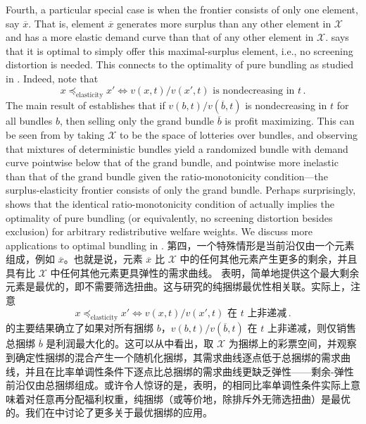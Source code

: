 \documentclass[12pt,letterpaper]{article}
\newenvironment{original}{\color{black}\noindent}{}
\newenvironment{translation}{\color{blue}\noindent}{}
\theoremstyle{plain}
\theoremstyle{definition}
\theoremstyle{remark}
\renewcommand{\1}{\mathds{1}}
\theoremstyle{definition}
\begin{document}
\begin{original}
Fourth, a particular special case is when the frontier consists of only one element, say $\overline{x}$. That is, element $\overline{x}$ generates more surplus than any other element in $\mathcal{X}$ and has a more elastic demand curve than that of any other element in $\mathcal{X}$.  says that it is optimal to simply offer this maximal-surplus element, i.e., no screening distortion is needed. This connects to the optimality of pure bundling as studied in \citet{haghpanah2021pure}. Indeed, note that
\[x \preceq_{\text{elasticity}} x'  \iff v(x, t)/v(x', t) \text{ is nondecreasing in $t$}\,.\]
The main result of \citet{haghpanah2021pure} establishes that if $v(b, t) / v(\overline{b}, t)$ is nondecreasing in $t$ for all bundles $b$, then selling only the grand bundle $\overline{b}$ is profit maximizing. This can be seen from  by taking $\mathcal{X}$ to be the space of lotteries over bundles, and observing that mixtures of deterministic bundles yield a randomized bundle with demand curve pointwise below that of the grand bundle, and pointwise more inelastic than that of the grand bundle given the ratio-monotonicity condition---the surplus-elasticity frontier consists of only the grand bundle. Perhaps surprisingly,  shows that the identical ratio-monotonicity condition of \citet{haghpanah2021pure} actually implies the optimality of pure bundling (or equivalently, no screening distortion besides exclusion) for arbitrary redistributive welfare weights. We discuss more applications to optimal bundling in .
\end{original}
\begin{translation}
第四，一个特殊情形是当前沿仅由一个元素组成，例如 $\overline{x}$。也就是说，元素 $\overline{x}$ 比 $\mathcal{X}$ 中的任何其他元素产生更多的剩余，并且具有比 $\mathcal{X}$ 中任何其他元素更具弹性的需求曲线。 表明，简单地提供这个最大剩余元素是最优的，即不需要筛选扭曲。这与\citet{haghpanah2021pure}研究的纯捆绑最优性相关联。实际上，注意
\[x \preceq_{\text{elasticity}} x'  \iff v(x, t)/v(x', t) \text{ 在 $t$ 上非递减}\,.\]
\citet{haghpanah2021pure}的主要结果确立了如果对所有捆绑 $b$，$v(b, t) / v(\overline{b}, t)$ 在 $t$ 上非递减，则仅销售总捆绑 $\overline{b}$ 是利润最大化的。这可以从中看出，取 $\mathcal{X}$ 为捆绑上的彩票空间，并观察到确定性捆绑的混合产生一个随机化捆绑，其需求曲线逐点低于总捆绑的需求曲线，并且在比率单调性条件下逐点比总捆绑的需求曲线更缺乏弹性——剩余-弹性前沿仅由总捆绑组成。或许令人惊讶的是，表明，\citet{haghpanah2021pure}的相同比率单调性条件实际上意味着对任意再分配福利权重，纯捆绑（或等价地，除排斥外无筛选扭曲）是最优的。我们在中讨论了更多关于最优捆绑的应用。
\end{translation}
\end{document}
